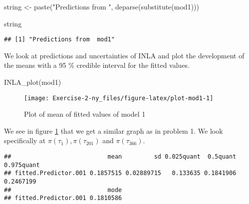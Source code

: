 \documentclass[
]{article}
\newenvironment{Shaded}{\begin{snugshade}}{\end{snugshade}}
\newcommand{\CommentTok}[1]{\textcolor[rgb]{0.56,0.35,0.01}{\textit{#1}}}
\newcommand{\DecValTok}[1]{\textcolor[rgb]{0.00,0.00,0.81}{#1}}
\newcommand{\FunctionTok}[1]{\textcolor[rgb]{0.00,0.00,0.00}{#1}}
\newcommand{\NormalTok}[1]{#1}
\newcommand{\OtherTok}[1]{\textcolor[rgb]{0.56,0.35,0.01}{#1}}
\newcommand{\SpecialCharTok}[1]{\textcolor[rgb]{0.00,0.00,0.00}{#1}}
\newcommand{\StringTok}[1]{\textcolor[rgb]{0.31,0.60,0.02}{#1}}
\begin{document}
\begin{Shaded}
\begin{Highlighting}[]
\NormalTok{string }\OtherTok{\textless{}{-}} \FunctionTok{paste}\NormalTok{(}\StringTok{"Predictions from "}\NormalTok{, }\FunctionTok{deparse}\NormalTok{(}\FunctionTok{substitute}\NormalTok{(mod1)))}
\end{Highlighting}
\end{Shaded}

\begin{Shaded}
\begin{Highlighting}[]
\NormalTok{string}
\end{Highlighting}
\end{Shaded}

\begin{verbatim}
## [1] "Predictions from  mod1"
\end{verbatim}

We look at predictions and uncertainties of INLA and plot the development of the means with a 95 \% credible interval for the fitted values.

\begin{Shaded}
\begin{Highlighting}[]
\FunctionTok{INLA\_plot}\NormalTok{(mod1)}
\end{Highlighting}
\end{Shaded}

\begin{figure}

{\centering \texttt{[image: Exercise-2-ny\_files/figure-latex/plot-mod1-1]} 

}

\caption{Plot of mean of fitted values of model 1}\label{fig:plot-mod1}
\end{figure}

We see in figure \ref{fig:plot-mod1} that we get a similar graph as in problem 1. We look specifically at \(\pi(\tau_1), \pi(\tau_{201})\) and \(\pi(\tau_{366}).\)

\begin{Shaded}
\end{Shaded}

\begin{verbatim}
##                           mean         sd 0.025quant  0.5quant 0.975quant
## fitted.Predictor.001 0.1857515 0.02889715   0.133635 0.1841906  0.2467199
##                           mode
## fitted.Predictor.001 0.1810586
\end{verbatim}
\end{document}
